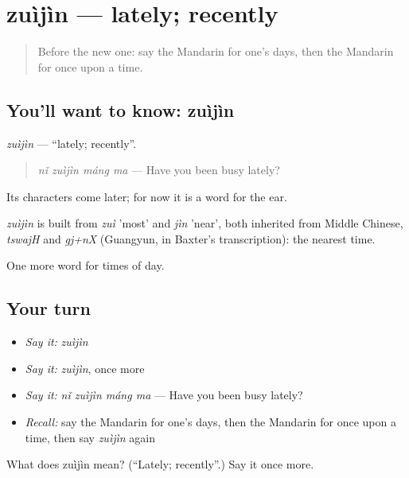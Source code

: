 \section[zuìjìn]{zuìjìn — lately; recently}

\label{lesson:ZH-C178-zuijin}



\begin{quote}
Before the new one: say the Mandarin for one's days, then the Mandarin for once upon a time.
\end{quote}

\subsection*{You'll want to know: zuìjìn}
\emph{zuìjìn} — \textquotedblleft{}lately; recently\textquotedblright{}.

\begin{quote}
\emph{nǐ zuìjìn máng ma} — Have you been busy lately?
\end{quote}

Its characters come later; for now it is a word for the ear.

\begin{cousinweb}
\emph{zuìjìn} is built from \emph{zuì} 'most' and \emph{jìn} 'near', both inherited from Middle Chinese, \emph{tswajH} and \emph{gj+nX} (Guangyun, in Baxter's transcription): the nearest time.
\end{cousinweb}

\begin{grammarlens}[title={What you've built}]
One more word for times of day.
\end{grammarlens}

\subsection*{Your turn}
\begin{itemize}
\raggedright
  \item \emph{Say it:} \emph{zuìjìn}
  \item \emph{Say it:} \emph{zuìjìn}, once more
  \item \emph{Say it:} \emph{nǐ zuìjìn máng ma} — Have you been busy lately?
  \item \emph{Recall:} say the Mandarin for one's days, then the Mandarin for once upon a time, then say \emph{zuìjìn} again
\end{itemize}

\begin{tcolorbox}[breakable,colback=teal!4,colframe=teal!35!black,title={Before you move on}]
What does zuìjìn mean? (\textquotedblleft{}Lately; recently\textquotedblright{}.) Say it once more.
\end{tcolorbox}
